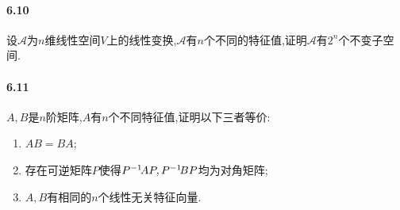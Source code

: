\documentclass[11pt]{article}
\begin{document}
\paragraph{6.10}设$\mathscr{A}$为$n$维线性空间$V$上的线性变换,$\mathscr{A}$有$n$个不同的特征值,证明$\mathscr{A}$有$2^n$个不变子空间.
\paragraph{6.11}$A,B$是$n$阶矩阵,$A$有$n$个不同特征值,证明以下三者等价:
\begin{enumerate}
    \item $AB=BA$;
    \item 存在可逆矩阵$P$使得$P^{-1}\! AP, P^{-1}\! BP$均为对角矩阵;
    \item $A,B$有相同的$n$个线性无关特征向量.
\end{enumerate}
\end{document}

